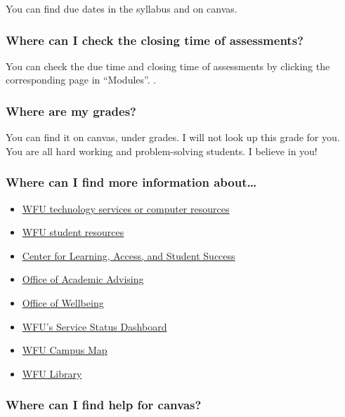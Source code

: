 You can find due dates in the syllabus and on canvas.

\hypertarget{where-can-i-check-the-closing-time-of-assessments}{%
\subsubsection{Where can I check the closing time of assessments?}\label{where-can-i-check-the-closing-time-of-assessments}}

You can check the due time and closing time of assessments by clicking the corresponding page in ``Modules''. .

\hypertarget{where-are-my-grades}{%
\subsubsection{Where are my grades?}\label{where-are-my-grades}}

You can find it on canvas, under grades. I will not look up this grade for you. You are all hard working and problem-solving students. I believe in you!

\hypertarget{where-can-i-find-more-information-about}{%
\subsubsection{Where can I find more information about\ldots{}}\label{where-can-i-find-more-information-about}}

\begin{itemize}
\tightlist
\item
  \href{https://is.wfu.edu/student/}{WFU technology services or computer resources}
\item
  \href{https://college.wfu.edu/student-resources/}{WFU student resources}
\item
  \href{https://class.wfu.edu/}{Center for Learning, Access, and Student Success}
\item
  \href{https://advising.wfu.edu/}{Office of Academic Advising}
\item
  \href{https://thrive.wfu.edu/}{Office of Wellbeing}
\item
  \href{https://status.is.wfu.edu/}{WFU's Service Status Dashboard}
\item
  \href{https://map.wfu.edu/}{WFU Campus Map}
\item
  \href{https://zsr.wfu.edu/}{WFU Library}
\end{itemize}

\hypertarget{where-can-i-find-help-for-canvas}{%
\subsubsection{Where can I find help for canvas?}\label{where-can-i-find-help-for-canvas}}

